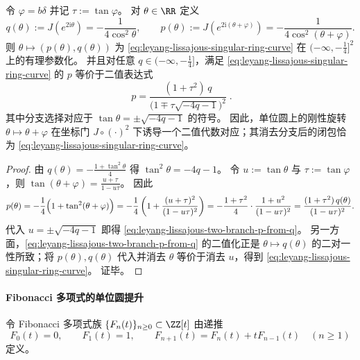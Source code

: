 \begin{proposition}[旋转诱导对应与二值显式分支]\label{prop:leyang-lissajous-rotation-correspondence}
令 \(\varphi=b\delta\) 并记 \(\tau:=\tan\varphi\)。
对 \(\theta\in\RR\) 定义
\[
q(\theta):=J(e^{2\mathrm{i}\theta})=-\frac{1}{4\cos^2\theta},\qquad
p(\theta):=J(e^{2\mathrm{i}(\theta+\varphi)})=-\frac{1}{4\cos^2(\theta+\varphi)}.
\]
则 \(\theta\mapsto(p(\theta),q(\theta))\) 为 \eqref{eq:leyang-lissajous-singular-ring-curve} 在 \((-\infty,-\tfrac14]^2\) 上的有理参数化。
并且对任意 \(q\in(-\infty,-\tfrac14]\)，满足 \eqref{eq:leyang-lissajous-singular-ring-curve} 的 \(p\) 等价于二值表达式
\begin{equation}\label{eq:leyang-lissajous-two-branch-p-from-q}
\boxed{\;
p=\frac{(1+\tau^2)\,q}{\bigl(1\mp \tau\sqrt{-4q-1}\bigr)^2}\; }.
\end{equation}
其中分支选择对应于 \(\tan\theta=\pm\sqrt{-4q-1}\) 的符号。
因此，单位圆上的刚性旋转 \(\theta\mapsto\theta+\varphi\) 在坐标门 \(J\circ(\cdot)^2\) 下诱导一个二值代数对应；其消去分支后的闭包恰为 \eqref{eq:leyang-lissajous-singular-ring-curve}。
\end{proposition}
\begin{proof}
由 \(q(\theta)=-\frac{1+\tan^2\theta}{4}\) 得 \(\tan^2\theta=-4q-1\)。
令 \(u:=\tan\theta\) 与 \(\tau:=\tan\varphi\)，则
\(
\tan(\theta+\varphi)=\frac{u+\tau}{1-u\tau}
\)。
因此
\[
p(\theta)=-\frac{1}{4}\Bigl(1+\tan^2(\theta+\varphi)\Bigr)
=-\frac{1}{4}\left(1+\frac{(u+\tau)^2}{(1-u\tau)^2}\right)
=-\frac{1+\tau^2}{4}\cdot\frac{1+u^2}{(1-u\tau)^2}
=\frac{(1+\tau^2)\,q(\theta)}{(1-u\tau)^2}.
\]
代入 \(u=\pm\sqrt{-4q-1}\) 即得 \eqref{eq:leyang-lissajous-two-branch-p-from-q}。
另一方面，\eqref{eq:leyang-lissajous-two-branch-p-from-q} 的二值化正是 \(\theta\mapsto q(\theta)\) 的二对一性所致；将 \(p(\theta),q(\theta)\) 代入并消去 \(\theta\) 等价于消去 \(u\)，得到 \eqref{eq:leyang-lissajous-singular-ring-curve}。
证毕。
\end{proof}



\paragraph{Fibonacci 多项式的单位圆提升}
令 Fibonacci 多项式族 \(\{F_n(t)\}_{n\ge 0}\subset\ZZ[t]\) 由递推
\begin{equation}\label{eq:fib-poly-recurrence}
F_0(t)=0,\qquad F_1(t)=1,\qquad F_{n+1}(t)=F_n(t)+tF_{n-1}(t)\quad(n\ge 1)
\end{equation}
定义。

